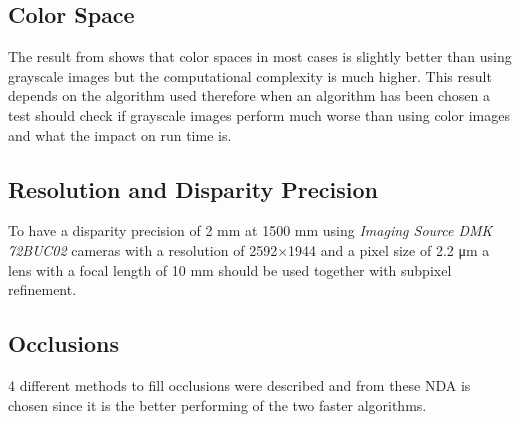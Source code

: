 \subsection*{Color Space}
The result from \cite{chambon2005colour} shows that color spaces in most cases is slightly better than using grayscale images but the computational complexity is much higher. This result depends on the algorithm used therefore when an algorithm has been chosen a test should check if grayscale images perform much worse than using color images and what the impact on run time is.

\subsection*{Resolution and Disparity Precision}
To have a disparity precision of 2 mm at 1500 mm using \textit{Imaging Source DMK 72BUC02} cameras with a resolution of 2592$\times$1944 and a pixel size of 2.2 \si{\micro\meter} a lens with a focal length of 10 mm should be used together with subpixel refinement.

\subsection*{Occlusions}
4 different methods to fill occlusions were described and from these NDA is chosen since it is the better performing of the two faster algorithms.